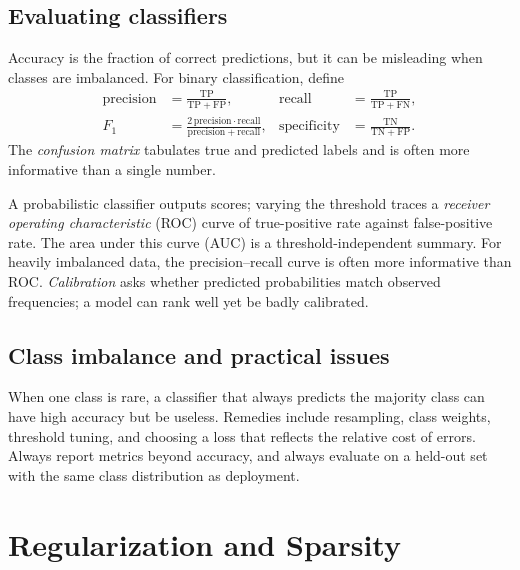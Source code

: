\documentclass[a4paper, 12pt]{book}
\begin{document}
\section{Evaluating classifiers}

Accuracy is the fraction of correct predictions, but it can be misleading when classes
are imbalanced. For binary classification, define
\begin{align}
    \mathrm{precision} &= \frac{\mathrm{TP}}{\mathrm{TP}+\mathrm{FP}}, &
    \mathrm{recall} &= \frac{\mathrm{TP}}{\mathrm{TP}+\mathrm{FN}},\\
    F_1 &= \frac{2\,\mathrm{precision}\cdot\mathrm{recall}}
                {\mathrm{precision}+\mathrm{recall}}, &
    \mathrm{specificity} &= \frac{\mathrm{TN}}{\mathrm{TN}+\mathrm{FP}}.
\end{align}
The \emph{confusion matrix} tabulates true and predicted labels and is often more
informative than a single number.

A probabilistic classifier outputs scores; varying the threshold traces a
\emph{receiver operating characteristic} (ROC) curve of true-positive rate against
false-positive rate. The area under this curve (AUC) is a threshold-independent
summary. For heavily imbalanced data, the precision--recall curve is often more
informative than ROC. \emph{Calibration} asks whether predicted probabilities match
observed frequencies; a model can rank well yet be badly calibrated.

\section{Class imbalance and practical issues}

When one class is rare, a classifier that always predicts the majority class can have
high accuracy but be useless. Remedies include resampling, class weights, threshold
tuning, and choosing a loss that reflects the relative cost of errors. Always report
metrics beyond accuracy, and always evaluate on a held-out set with the same class
distribution as deployment.


\chapter{Regularization and Sparsity}
\label{ch:reg}
\end{document}
